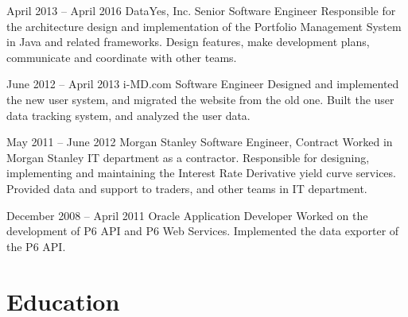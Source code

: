 \documentclass[
	10pt, %
]{FreemanCV}
\begin{document}
\begin{paracol}{2}

\jobentry
	{April 2013 -- April 2016} %
	{} %
	{DataYes, Inc.} %
	{Senior Software Engineer} %
	{Responsible for the architecture design and implementation of the Portfolio Management System in Java and related frameworks. Design features, make development plans, communicate and coordinate with other teams.}


\jobentry
	{June 2012 -- April 2013} %
	{} %
	{i-MD.com} %
	{Software Engineer} %
	{Designed and implemented the new user system, and migrated the website from the old one. Built the user data tracking system, and analyzed the user data.} %


\jobentry
	{May 2011 -- June 2012} %
	{} %
	{Morgan Stanley} %
	{Software Engineer, Contract} %
	{Worked in Morgan Stanley IT department as a contractor. Responsible for designing, implementing and maintaining the Interest Rate Derivative yield curve services. Provided data and support to traders, and other teams in IT department.} %


\jobentry
	{December 2008 -- April 2011} %
	{} %
	{Oracle} %
	{Application Developer} %
	{Worked on the development of P6 API and P6 Web Services. Implemented the data exporter of the P6 API.} %


\section{Education} 



\end{paracol}
\end{document}
